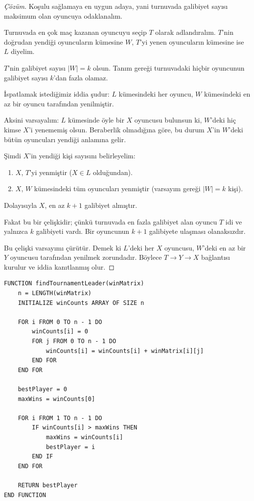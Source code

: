 \begin{proof}[Çözüm]
Koşulu sağlamaya en uygun adaya, yani turnuvada galibiyet sayısı maksimum olan oyuncuya odaklanalım.

Turnuvada en çok maç kazanan oyuncuyu seçip $T$ olarak adlandıralım. $T$'nin doğrudan yendiği oyuncuların kümesine $W$, $T$'yi yenen oyuncuların kümesine ise $L$ diyelim.

\begin{center}
$T$'nin galibiyet sayısı $|W| = k$ olsun. Tanım gereği turnuvadaki hiçbir oyuncunun galibiyet sayısı $k$'dan fazla olamaz.
\end{center}

İspatlamak istediğimiz iddia şudur: $L$ kümesindeki her oyuncu, $W$ kümesindeki en az bir oyuncu tarafından yenilmiştir.

Aksini varsayalım: $L$ kümesinde öyle bir $X$ oyuncusu bulunsun ki, $W$'deki hiç kimse $X$'i yenememiş olsun. Beraberlik olmadığına göre, bu durum $X$'in $W$'deki bütün oyuncuları yendiği anlamına gelir.

Şimdi $X$'in yendiği kişi sayısını belirleyelim:
\begin{enumerate}
    \item $X$, $T$'yi yenmiştir ($X \in L$ olduğundan).
    \item $X$, $W$ kümesindeki tüm oyuncuları yenmiştir (varsayım gereği $|W| = k$ kişi).
\end{enumerate}
Dolayısıyla $X$, en az $k + 1$ galibiyet almıştır. 

Fakat bu bir çelişkidir; çünkü turnuvada en fazla galibiyet alan oyuncu $T$ idi ve yalnızca $k$ galibiyeti vardı. Bir oyuncunun $k+1$ galibiyete ulaşması olanaksızdır.

Bu çelişki varsayımı çürütür. Demek ki $L$'deki her $X$ oyuncusu, $W$'deki en az bir $Y$ oyuncusu tarafından yenilmek zorundadır. Böylece $T \to Y \to X$ bağlantısı kurulur ve iddia kanıtlanmış olur.
\end{proof}

\begin{lstlisting}
FUNCTION findTournamentLeader(winMatrix)
    n = LENGTH(winMatrix)
    INITIALIZE winCounts ARRAY OF SIZE n
    
    FOR i FROM 0 TO n - 1 DO
        winCounts[i] = 0
        FOR j FROM 0 TO n - 1 DO
            winCounts[i] = winCounts[i] + winMatrix[i][j]
        END FOR
    END FOR
    
    bestPlayer = 0
    maxWins = winCounts[0]
    
    FOR i FROM 1 TO n - 1 DO
        IF winCounts[i] > maxWins THEN
            maxWins = winCounts[i]
            bestPlayer = i
        END IF
    END FOR
    
    RETURN bestPlayer
END FUNCTION\end{lstlisting}

